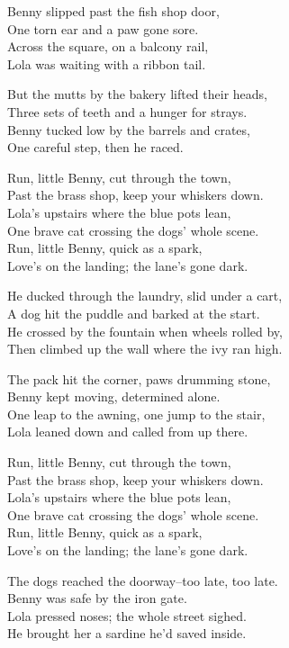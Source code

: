 \begin{lyrics}
Benny slipped past the fish shop door,\\
One torn ear and a paw gone sore.\\
Across the square, on a balcony rail,\\
Lola was waiting with a ribbon tail.

But the mutts by the bakery lifted their heads,\\
Three sets of teeth and a hunger for strays.\\
Benny tucked low by the barrels and crates,\\
One careful step, then he raced.

Run, little Benny, cut through the town,\\
Past the brass shop, keep your whiskers down.\\
Lola's upstairs where the blue pots lean,\\
One brave cat crossing the dogs' whole scene.\\
Run, little Benny, quick as a spark,\\
Love's on the landing; the lane's gone dark.

He ducked through the laundry, slid under a cart,\\
A dog hit the puddle and barked at the start.\\
He crossed by the fountain when wheels rolled by,\\
Then climbed up the wall where the ivy ran high.

The pack hit the corner, paws drumming stone,\\
Benny kept moving, determined alone.\\
One leap to the awning, one jump to the stair,\\
Lola leaned down and called from up there.

Run, little Benny, cut through the town,\\
Past the brass shop, keep your whiskers down.\\
Lola's upstairs where the blue pots lean,\\
One brave cat crossing the dogs' whole scene.\\
Run, little Benny, quick as a spark,\\
Love's on the landing; the lane's gone dark.

The dogs reached the doorway--too late, too late.\\
Benny was safe by the iron gate.\\
Lola pressed noses; the whole street sighed.\\
He brought her a sardine he'd saved inside.


\end{lyrics}
